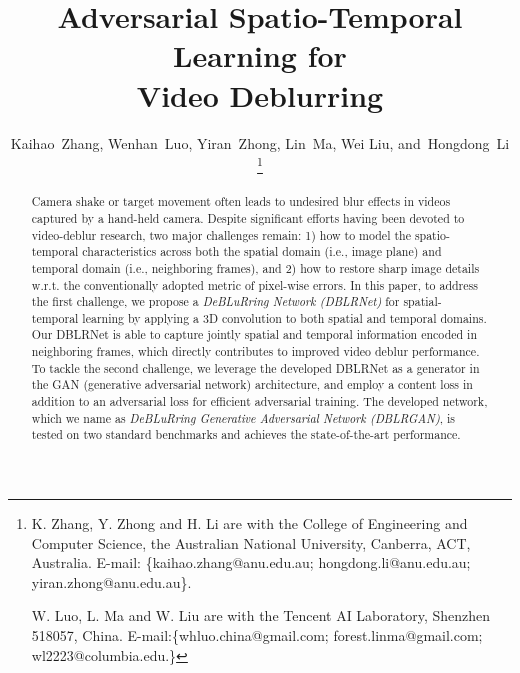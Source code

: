 \documentclass[journal]{IEEEtran}
\begin{document}
\title{Adversarial Spatio-Temporal Learning for\\ Video Deblurring}

\author{Kaihao~Zhang,
        Wenhan~Luo,
        Yiran~Zhong,
        Lin~Ma,
        Wei Liu,
        and~Hongdong~Li%
\thanks{K. Zhang, Y. Zhong and H. Li are with the College of Engineering and Computer Science, the Australian National University, Canberra, ACT,  Australia. E-mail: \{kaihao.zhang@anu.edu.au; hongdong.li@anu.edu.au; yiran.zhong@anu.edu.au\}.

W. Luo, L. Ma and W. Liu are with the Tencent AI Laboratory, Shenzhen 518057, China. E-mail:\{whluo.china@gmail.com; forest.linma@gmail.com; wl2223@columbia.edu.\} }}%



















\maketitle

\begin{abstract}
Camera shake or target movement often leads to undesired blur effects in videos captured by a hand-held camera. Despite significant efforts having been devoted to video-deblur research, two major challenges remain: 1) how to model the spatio-temporal characteristics across both the spatial domain (i.e., image plane) and temporal domain (i.e., neighboring frames), and 2) how to restore sharp image details w.r.t. the conventionally adopted metric of pixel-wise errors. In this paper, to address the first challenge, we propose a {\em DeBLuRring Network (DBLRNet)} for spatial-temporal learning by applying a 3D convolution to both spatial and temporal domains. Our DBLRNet is able to capture jointly spatial and temporal information encoded in neighboring frames, which directly contributes to improved video deblur performance. To tackle the second challenge, we leverage the developed DBLRNet as a generator in the GAN (generative adversarial network) architecture, and employ a content loss in addition to an adversarial loss for efficient adversarial training.  The developed network, which we name as {\em DeBLuRring Generative Adversarial Network (DBLRGAN)}, is tested on two standard benchmarks and achieves the state-of-the-art performance.
\end{abstract}
\end{document}
